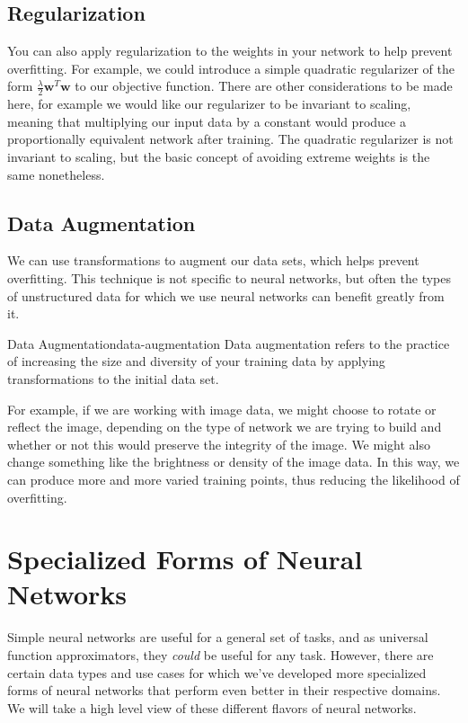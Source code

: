 
\subsection{Regularization}
You can also apply regularization to the weights in your network to help prevent overfitting. For example, we could introduce a simple quadratic regularizer of the form $\frac{\lambda}{2} \textbf{w}^{T}\textbf{w}$ to our objective function. There are other considerations to be made here, for example we would like our regularizer to be invariant to scaling, meaning that multiplying our input data by a constant would produce a proportionally equivalent network after training. The quadratic regularizer is not invariant to scaling, but the basic concept of avoiding extreme weights is the same nonetheless.

\subsection{Data Augmentation}
We can use transformations to augment our data sets, which helps prevent overfitting. This technique is not specific to neural networks, but often the types of unstructured data for which we use neural networks can benefit greatly from it.
\begin{definition}{Data Augmentation}{data-augmentation}
Data augmentation refers to the practice of increasing the size and diversity of your training data by applying transformations to the initial data set.
\end{definition}
For example, if we are working with image data, we might choose to rotate or reflect the image, depending on the type of network we are trying to build and whether or not this would preserve the integrity of the image. We might also change something like the brightness or density of the image data. In this way, we can produce more and more varied training points, thus reducing the likelihood of overfitting.

\section{Specialized Forms of Neural Networks}
Simple neural networks are useful for a general set of tasks, and as universal function approximators, they \textit{could} be useful for any task. However, there are certain data types and use cases for which we've developed more specialized forms of neural networks that perform even better in their respective domains. We will take a high level view of these different flavors of neural networks.

